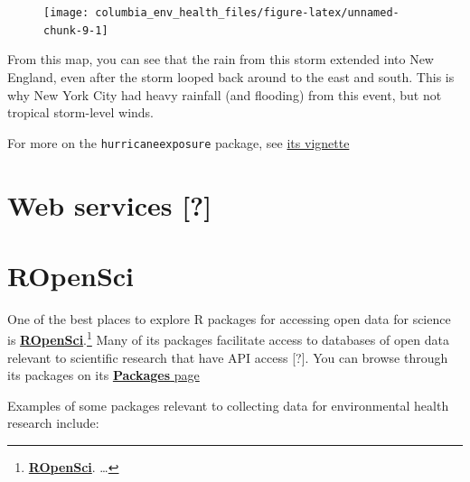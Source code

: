 \documentclass[]{tufte-book}
\begin{document}
\begin{figure}
\texttt{[image: columbia\_env\_health\_files/figure-latex/unnamed-chunk-9-1]} \end{figure}

From this map, you can see that the rain from this storm extended into New
England, even after the storm looped back around to the east and south. This is
why New York City had heavy rainfall (and flooding) from this event, but not
tropical storm-level winds.

For more on the \texttt{hurricaneexposure} package, see \href{https://cran.r-project.org/web/packages/hurricaneexposure/vignettes/hurricaneexposure.html}{its vignette}

\hypertarget{web-services}{%
\section{Web services {[}?{]}}\label{web-services}}

\hypertarget{ropensci}{%
\section{ROpenSci}\label{ropensci}}

One of the best places to explore R packages for accessing open data for science is
\href{https://ropensci.org/}{\textbf{ROpenSci}}.\footnote{\href{https://ropensci.org/}{\textbf{ROpenSci}}. \ldots{}}
Many of its packages facilitate access to databases of open data relevant to scientific
research that have API access {[}?{]}. You can browse through its packages on
its \href{https://ropensci.org/packages/}{\textbf{Packages} page}

Examples of some packages relevant to collecting data for environmental health research
include:
\end{document}

